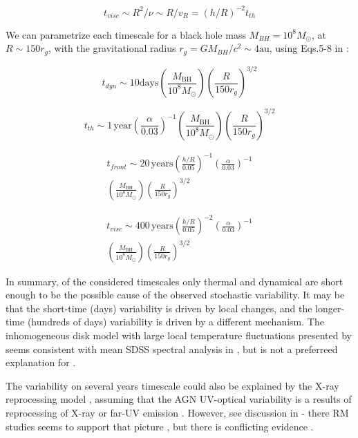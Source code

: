 \documentclass[twocolumn]{aastex62}
\begin{document}
\begin{equation}
t_{visc} {\sim} R^{2} / \nu {\sim}  R / v_{R} = (h/R)^{-2} t_{th}
\end{equation}

 We can parametrize each timescale for a black hole mass $M_{BH} = 10^{8} M_{\odot}$, at $R {\sim} 150 r_{g}$, with the gravitational radius $r_{g} = GM_{BH} / c^{2} {\sim} 4 \mathrm{au}$, using Eqs.5-8 in \cite{stern2018} : 


 \begin{equation}
 t_{dyn} {\sim} 10  \mathrm{days} \left(\frac{M_{\mathrm{BH}}}{10^{8} M_{\odot}} \right) 
 \left( \frac{R}{150 r_{g}}\right) ^{3/2} 
 \end{equation}

 \begin{equation}
 t_{th}   {\sim} 1 \,\mathrm{year} \left( \frac{\alpha}{0.03}\right)^{-1}  
 \left( \frac{M_{\mathrm{BH}}}{10^{8} M_{\odot}}\right) \left( \frac{R}{150 r_{g}}\right)^{3/2} 
 \end{equation}

  \begin{eqnarray}
  t_{front} {\sim} 20 \,\mathrm{years} \left( \frac{h/R}{0.05}\right)^{-1}   \left( \frac{\alpha}{0.03}\right)^{-1}  \nonumber  \\ 
  \left( \frac{M_{\mathrm{BH}}}{10^{8} M_{\odot}}\right)     \left( \frac{R}{150 r_{g}}\right) ^{3/2} 
 \end{eqnarray}

  \begin{eqnarray}
  t_{visc}  {\sim} 400 \, \mathrm{years} \left( \frac{h/R}{0.05}\right)^{-2}   \left( \frac{\alpha}{0.03}\right)^{-1} \nonumber  \\  
  \left(\frac{M_{\mathrm{BH}}}{10^{8} M_{\odot}} \right)     \left( \frac{R}{150 r_{g}}\right) ^{3/2}  
 \end{eqnarray}


In summary,  of the  considered timescales only thermal and dynamical are short enough to be the possible cause of the observed stochastic variability. It may be that the short-time (days) variability is driven by local changes, and the longer-time (hundreds of days) variability is driven by a different mechanism\citep{kokubo2015}. The inhomogeneous disk model with large local temperature fluctuations presented by \citet{dexter2011} seems consistent with mean SDSS spectral analysis in \citet{ruan2014}, but is not a preferreed explanation for \citet{kokubo2015}. 

The variability on several years timescale could also be explained by the X-ray reprocessing model \cite{kubota2018}, assuming that the AGN UV-optical variability is a results of reprocessing of X-ray or far-UV emission \citep{krolik1991}. However, see discussion in \citet{kokubo2015} - there RM studies seems to support that picture \citep{mchardy2018}, but there is conflicting evidence \citep{edelson2014, zhu2018}. 
\end{document}
